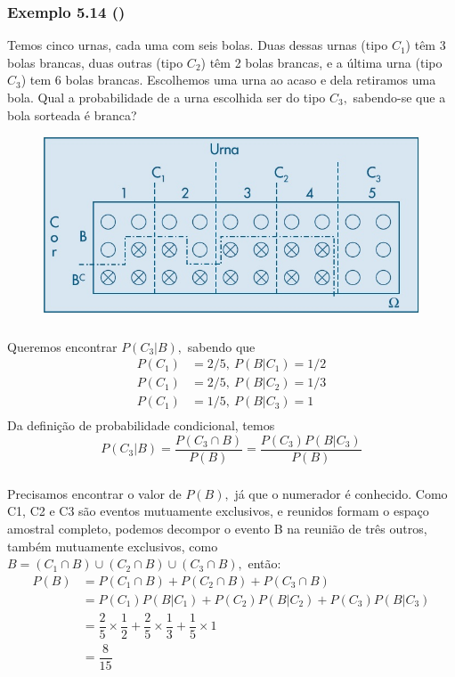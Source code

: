 \documentclass[14pt,aspectratio=1610]{beamer}
\begin{document}
\begin{frame}{}
\frametitle{Exemplo 5.14 (\cite{Morettin09})}
  \begin{block}{}
  \justifying
Temos cinco urnas, cada uma com seis bolas. Duas dessas urnas (tipo $C_1$) têm 3 bolas brancas, duas outras (tipo $C_2$) têm 2 bolas brancas, e a última urna (tipo $C_3$) tem 6 bolas brancas. Escolhemos uma urna ao acaso e dela retiramos uma bola. Qual a probabilidade de a urna escolhida ser do tipo $C_3,$ sabendo-se que a bola sorteada é branca?
\end{block}
    \begin{figure}[H]
    \centering
    \includegraphics[height=0.3\textwidth,width=15cm]{Figuras/ex5_14}
    \end{figure}
  
\end{frame}


\begin{frame}{}
\frametitle{}
\begin{block}{}
\justifying
Queremos encontrar $P(C_3|B),$ sabendo que
\begin{align*}
P(C_{1})&=2/5,\ P(B|C_{1})=1/2\\
P(C_{1})&=2/5,\ P(B|C_{2})=1/3\\
P(C_{1})&=1/5,\ P(B|C_{3})=1\\
\end{align*}
Da definição de probabilidade condicional, temos
$$P(C_{3}|B)=\dfrac{P(C_{3}\cap B)}{P(B)}=\dfrac{P(C_{3})P(B|C_{3})}{P(B)}$$
\end{block}
\end{frame}

\begin{frame}{}
\frametitle{}
\begin{block}{}
\justifying
Precisamos encontrar o valor de $P(B),$ já que o numerador é conhecido. Como C1,
C2 e C3 são eventos mutuamente exclusivos, e reunidos formam o espaço amostral
completo, podemos decompor o evento B na reunião de três outros, também mutuamente
exclusivos, como $B=(C_{1}\cap B)\cup (C_{2}\cap B)\cup (C_{3}\cap B),$ então:
\begin{align*}
P(B)&=P(C_{1}\cap B)+P(C_{2}\cap B)+P(C_{3}\cap B)\\
&=P(C_{1})P(B|C_{1})+P(C_{2})P(B|C_{2})+P(C_{3})P(B|C_{3})\\
&=\dfrac{2}{5}\times \dfrac{1}{2}+\dfrac{2}{5}\times \dfrac{1}{3}+\dfrac{1}{5}\times 1\\
&=\dfrac{8}{15}
\end{align*}
\end{block}
\end{frame}
\end{document}

